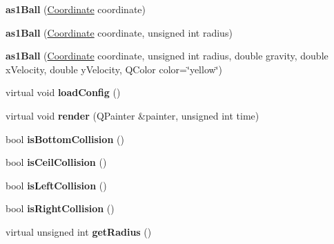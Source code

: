 \begin{DoxyCompactItemize}
\item 
\hypertarget{classas1_ball_a5871e96a3e1bddf3df7a195688bb06d2}{{\bfseries as1\+Ball} (\hyperlink{class_coordinate}{Coordinate} coordinate)}\label{classas1_ball_a5871e96a3e1bddf3df7a195688bb06d2}

\item 
\hypertarget{classas1_ball_a1c9195b4cb0f4a39fca5d953de5e307b}{{\bfseries as1\+Ball} (\hyperlink{class_coordinate}{Coordinate} coordinate, unsigned int radius)}\label{classas1_ball_a1c9195b4cb0f4a39fca5d953de5e307b}

\item 
\hypertarget{classas1_ball_ad2e4c9d8622aad39d58a4deb53574026}{{\bfseries as1\+Ball} (\hyperlink{class_coordinate}{Coordinate} coordinate, unsigned int radius, double gravity, double x\+Velocity, double y\+Velocity, Q\+Color color=\char`\"{}yellow\char`\"{})}\label{classas1_ball_ad2e4c9d8622aad39d58a4deb53574026}

\item 
\hypertarget{classas1_ball_a8929bd8fd5810527e81608cee0f99bf5}{virtual void {\bfseries load\+Config} ()}\label{classas1_ball_a8929bd8fd5810527e81608cee0f99bf5}

\item 
\hypertarget{classas1_ball_a046852dd2f017ebd18d6ed02abb45528}{virtual void {\bfseries render} (Q\+Painter \&painter, unsigned int time)}\label{classas1_ball_a046852dd2f017ebd18d6ed02abb45528}

\item 
\hypertarget{classas1_ball_aef4912a4fdb0a72b8f29f5d45deb141a}{bool {\bfseries is\+Bottom\+Collision} ()}\label{classas1_ball_aef4912a4fdb0a72b8f29f5d45deb141a}

\item 
\hypertarget{classas1_ball_a20674bb1a8af99b6c51bcde24ba882dc}{bool {\bfseries is\+Ceil\+Collision} ()}\label{classas1_ball_a20674bb1a8af99b6c51bcde24ba882dc}

\item 
\hypertarget{classas1_ball_a5b35c5e1a948dddbe647371e8cf850fe}{bool {\bfseries is\+Left\+Collision} ()}\label{classas1_ball_a5b35c5e1a948dddbe647371e8cf850fe}

\item 
\hypertarget{classas1_ball_aea3ddc6cd7bd1b8aabdee0ccc74e0cbb}{bool {\bfseries is\+Right\+Collision} ()}\label{classas1_ball_aea3ddc6cd7bd1b8aabdee0ccc74e0cbb}

\item 
\hypertarget{classas1_ball_a78df2e2ada3bcfc2c13bea07f624c08a}{virtual unsigned int {\bfseries get\+Radius} ()}\label{classas1_ball_a78df2e2ada3bcfc2c13bea07f624c08a}


\end{DoxyCompactItemize}
